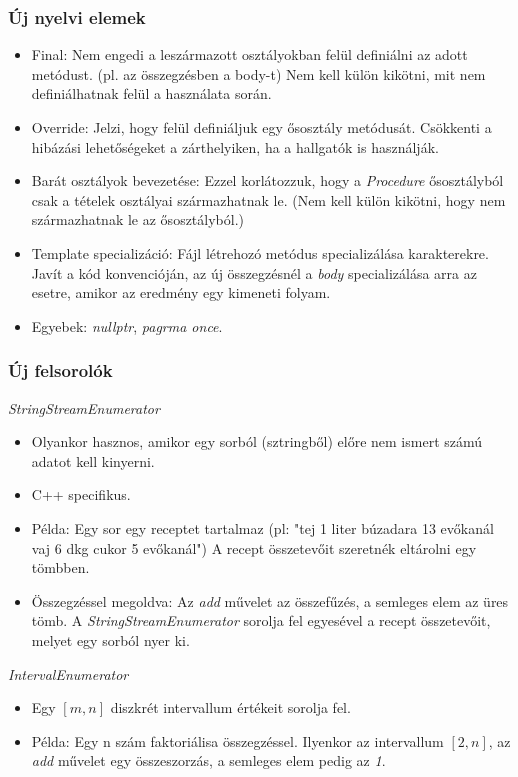 \documentclass[11pt]{beamer}
\begin{document}
\begin{frame}
	\frametitle{Új nyelvi elemek}
	\begin{itemize}
		\item Final: Nem engedi a leszármazott osztályokban felül definiálni az adott metódust. (pl. az összegzésben a body-t) Nem kell külön kikötni, mit nem definiálhatnak felül a használata során.
		\item Override: Jelzi, hogy felül definiáljuk egy ősosztály metódusát. Csökkenti a hibázási lehetőségeket a zárthelyiken, ha a hallgatók is használják.
		\item Barát osztályok bevezetése: Ezzel korlátozzuk, hogy a \textit{Procedure} ősosztályból csak a tételek osztályai származhatnak le. (Nem kell külön kikötni, hogy nem származhatnak le az ősosztályból.)
		\item Template specializáció: Fájl létrehozó metódus specializálása karakterekre. Javít a kód konvencióján, az új összegzésnél a \textit{body} specializálása arra az esetre, amikor az eredmény egy kimeneti folyam.
		\item Egyebek: \textit{nullptr}, \textit{pagrma once}.
	\end{itemize}
\end{frame}

\begin{frame}
	\frametitle{Új felsorolók}
		 \textit{StringStreamEnumerator} 
		 \begin{itemize}
		 	\item Olyankor hasznos, amikor egy sorból (sztringből) előre nem ismert számú adatot kell kinyerni.
		 	\item C++ specifikus.
		 	\item Példa: Egy sor egy receptet tartalmaz (pl: "tej 1 liter búzadara 13 evőkanál vaj 6 dkg cukor 5 evőkanál") A recept összetevőit szeretnék eltárolni egy tömbben.
		 	\item Összegzéssel megoldva: Az \textit{add} művelet az összefűzés, a semleges elem az üres tömb. A \textit{StringStreamEnumerator} sorolja fel egyesével a recept összetevőit, melyet egy sorból nyer ki.
		 \end{itemize}
		
		\textit{IntervalEnumerator}
		\begin{itemize}
			\item Egy $[m,n]$ diszkrét intervallum értékeit sorolja fel.
			\item Példa: Egy n szám faktoriálisa összegzéssel. Ilyenkor az intervallum $[2,n]$, az \textit{add} művelet egy összeszorzás, a semleges elem pedig az \textit{1}.
		\end{itemize}
		
\end{frame}
\end{document}
